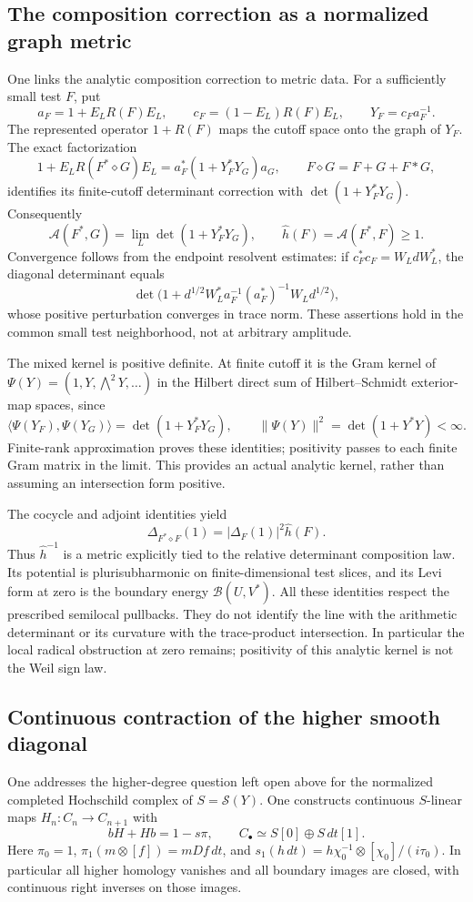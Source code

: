 \documentclass[11pt]{amsart}
\theoremstyle{definition}
\theoremstyle{remark}
\begin{document}
\subsection{The composition correction as a normalized graph metric}
One links the analytic composition correction to metric data.
For a sufficiently small test $F$, put
\[
 a_F=1+E_LR(F)E_L,\qquad c_F=(1-E_L)R(F)E_L,
 \qquad Y_F=c_Fa_F^{-1}.
\]
The represented operator $1+R(F)$ maps the cutoff space onto the graph
of $Y_F$. The exact factorization
\[
 1+E_LR(F^*\mathbin{\diamond}G)E_L
       =a_F^*(1+Y_F^*Y_G)a_G,
 \qquad F\mathbin{\diamond}G=F+G+F*G,
\]
identifies its finite-cutoff determinant correction with
$\det(1+Y_F^*Y_G)$. Consequently
\[
 \mathcal A(F^*,G)=\lim_L\det(1+Y_F^*Y_G),\qquad
 \widehat h(F)=\mathcal A(F^*,F)\geq1.
\]
Convergence follows from the endpoint resolvent estimates: if
$c_F^*c_F=W_LdW_L^*$, the diagonal determinant equals
\[
 \det\bigl(1+d^{1/2}W_L^*a_F^{-1}(a_F^*)^{-1}W_Ld^{1/2}\bigr),
\]
whose positive perturbation converges in trace norm. These assertions
hold in the common small test neighborhood, not at arbitrary amplitude.

The mixed kernel is positive definite. At finite cutoff it is the
Gram kernel of
$\Psi(Y)=(1,Y,\bigwedge^2Y,\ldots)$ in the Hilbert direct sum of
Hilbert--Schmidt exterior-map spaces, since
\[
 \langle\Psi(Y_F),\Psi(Y_G)\rangle=\det(1+Y_F^*Y_G),
 \qquad \|\Psi(Y)\|^2=\det(1+Y^*Y)<\infty.
\]
Finite-rank approximation proves these identities; positivity passes
to each finite Gram matrix in the limit. This provides an actual
analytic kernel, rather than assuming an intersection form positive.

The cocycle and adjoint identities yield
\[
 \Delta_{F^*\mathbin{\diamond}F}(1)
          =|\Delta_F(1)|^2\widehat h(F).
\]
Thus $\widehat h^{-1}$ is a metric explicitly tied to the relative
determinant composition law. Its potential is plurisubharmonic on
finite-dimensional test slices, and its Levi form at zero is the
boundary energy $\mathcal B(U,V^*)$. All these identities respect
the prescribed semilocal pullbacks. They do not identify the line with
the arithmetic determinant or its curvature with the trace-product
intersection. In particular the local radical obstruction at zero
remains; positivity of this analytic kernel is not the Weil sign law.

\subsection{Continuous contraction of the higher smooth diagonal}\label{ss:highercontr}
One addresses the higher-degree question left open above for the
normalized completed Hochschild complex of $S=\mathcal S(Y)$. One
constructs continuous $S$-linear maps $H_n:C_n\to C_{n+1}$ with
\[
 bH+Hb=1-s\pi,\qquad
 C_\bullet\simeq S[0]\oplus S\,dt[1].
\]
Here $\pi_0=1$, $\pi_1(m\otimes[f])=mDf\,dt$, and
$s_1(h\,dt)=h\chi_0^{-1}\otimes[\chi_0]/(i\tau_0)$.
In particular all higher homology vanishes and all boundary images
are closed, with continuous right inverses on those images.
\end{document}

